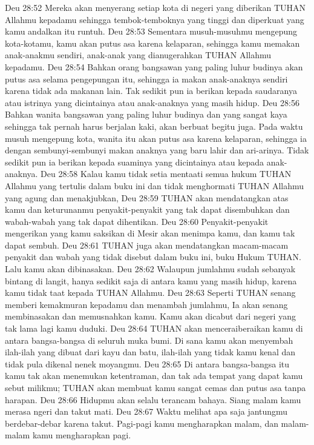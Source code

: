 Deu 28:52  Mereka akan menyerang setiap kota di negeri yang diberikan TUHAN Allahmu kepadamu sehingga tembok-temboknya yang tinggi dan diperkuat yang kamu andalkan itu runtuh.
Deu 28:53  Sementara musuh-musuhmu mengepung kota-kotamu, kamu akan putus asa karena kelaparan, sehingga kamu memakan anak-anakmu sendiri, anak-anak yang dianugerahkan TUHAN Allahmu kepadamu.
Deu 28:54  Bahkan orang bangsawan yang paling luhur budinya akan putus asa selama pengepungan itu, sehingga ia makan anak-anaknya sendiri karena tidak ada makanan lain. Tak sedikit pun ia berikan kepada saudaranya atau istrinya yang dicintainya atau anak-anaknya yang masih hidup.
Deu 28:56  Bahkan wanita bangsawan yang paling luhur budinya dan yang sangat kaya sehingga tak pernah harus berjalan kaki, akan berbuat begitu juga. Pada waktu musuh mengepung kota, wanita itu akan putus asa karena kelaparan, sehingga ia dengan sembunyi-sembunyi makan anaknya yang baru lahir dan ari-arinya. Tidak sedikit pun ia berikan kepada suaminya yang dicintainya atau kepada anak-anaknya.
Deu 28:58  Kalau kamu tidak setia mentaati semua hukum TUHAN Allahmu yang tertulis dalam buku ini dan tidak menghormati TUHAN Allahmu yang agung dan menakjubkan,
Deu 28:59  TUHAN akan mendatangkan atas kamu dan keturunanmu penyakit-penyakit yang tak dapat disembuhkan dan wabah-wabah yang tak dapat dihentikan.
Deu 28:60  Penyakit-penyakit mengerikan yang kamu saksikan di Mesir akan menimpa kamu, dan kamu tak dapat sembuh.
Deu 28:61  TUHAN juga akan mendatangkan macam-macam penyakit dan wabah yang tidak disebut dalam buku ini, buku Hukum TUHAN. Lalu kamu akan dibinasakan.
Deu 28:62  Walaupun jumlahmu sudah sebanyak bintang di langit, hanya sedikit saja di antara kamu yang masih hidup, karena kamu tidak taat kepada TUHAN Allahmu.
Deu 28:63  Seperti TUHAN senang memberi kemakmuran kepadamu dan menambah jumlahmu, Ia akan senang membinasakan dan memusnahkan kamu. Kamu akan dicabut dari negeri yang tak lama lagi kamu duduki.
Deu 28:64  TUHAN akan menceraiberaikan kamu di antara bangsa-bangsa di seluruh muka bumi. Di sana kamu akan menyembah ilah-ilah yang dibuat dari kayu dan batu, ilah-ilah yang tidak kamu kenal dan tidak pula dikenal nenek moyangmu.
Deu 28:65  Di antara bangsa-bangsa itu kamu tak akan menemukan ketentraman, dan tak ada tempat yang dapat kamu sebut milikmu; TUHAN akan membuat kamu sangat cemas dan putus asa tanpa harapan.
Deu 28:66  Hidupmu akan selalu terancam bahaya. Siang malam kamu merasa ngeri dan takut mati.
Deu 28:67  Waktu melihat apa saja jantungmu berdebar-debar karena takut. Pagi-pagi kamu mengharapkan malam, dan malam-malam kamu mengharapkan pagi.
